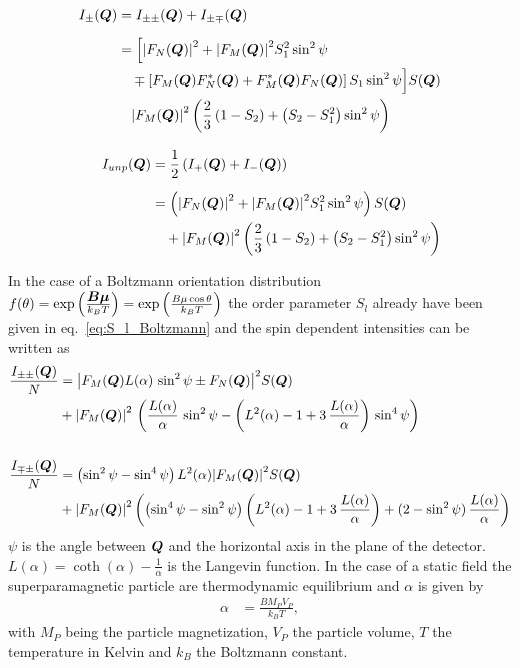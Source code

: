 \begin{subequations} \label{eq:I_iSQ_I_unpSQ}
\begin{align}
\begin{split}
    I_{\pm}(\BM{Q}) &= I_{\pm\pm}(\BM{Q})+I_{\pm\mp}(\BM{Q}) \\[2mm]
                    &= \Bigl[\abs{F_N(\BM{Q})}^2 + \abs{F_M(\BM{Q})}^2S_1^2\sin^2\psi \\
                    & \quad  \mp \left[F_M(\BM{Q})F^*_N(\BM{Q})+F^*_M(\BM{Q})F_N(\BM{Q})\right]S_1\sin^2\psi\Bigr] S(\BM{Q}) \\
                    & \quad \abs{F_M(\BM{Q})}^2\left(\frac{2}{3}\left(1-S_2\right)+\left(S_2-S_1^2\right)\sin^2\psi \right)
\end{split} \\[3mm]
\begin{split}
    I_{unp}(\BM{Q}) &= \frac{1}{2}\left(I_{+}(\BM{Q})+I_{-}(\BM{Q})\right)\\[2mm]
                    &=  \left(\abs{F_N(\BM{Q})}^2 + \abs{F_M(\BM{Q})}^2S_1^2\sin^2\psi\right) S(\BM{Q}) \\
                    & \quad + \abs{F_M(\BM{Q})}^2\left(\frac{2}{3}\left(1-S_2\right)+\left(S_2-S_1^2\right)\sin^2\psi\right)
\end{split}
\end{align}
\end{subequations}

In the case of a Boltzmann orientation distribution
$f(\theta)=\exp\left(\frac{\BM{B\mu}}{k_BT}\right)=\exp\left(\frac{B\mu\cos\theta}{k_BT}\right)$
the order parameter $S_l$ already have been given in eq.\ \ref{eq:S_l_Boltzmann}
and the spin dependent intensities can be written as
\begin{subequations}
\begin{align}
\frac{I_{\pm\pm}(\BM{Q})}{N} &=
\abs{F_M(\BM{Q}) L(\alpha)\,\sin^2\psi
     \pm F_N(\BM{Q})}^2 S(\BM{Q}) \\
&+
\abs{F_M(\BM{Q})}^2\, \left( \frac{L(\alpha)}{\alpha}\,
\sin^2\psi - \left( L^2(\alpha)-1+3\,\frac{L(\alpha)}{\alpha}\right)
\, \sin^4\psi \right) \nonumber \\
\nonumber \\
\frac{I_{\mp\pm}(\BM{Q})}{N} &=
\left( \sin^2\psi - \sin^4\psi \right)
L^2(\alpha)
\abs{F_M(\BM{Q})}^2 S(\BM{Q}) \\
&+
\abs{F_M(\BM{Q})}^2  \left( \left( \sin^4\psi-\sin^2\psi \right)
\left( L^2(\alpha)-1+3\, \frac{L(\alpha)}{\alpha}\right) +
(2-\sin^2\psi)\, \frac{L(\alpha)}{\alpha}\right) \nonumber
\end{align}
\end{subequations}
$\psi$ is the angle between $\BM{Q}$ and the horizontal axis in the plane of the detector.
$L(\alpha)=\coth(\alpha)-\frac{1}{\alpha}$ is the Langevin function. In the case of a static field
the superparamagnetic particle are thermodynamic equilibrium and $\alpha$ is given by
\begin{align}
\alpha&=\frac{BM_PV_P}{k_B T},
\end{align}
with $M_P$ being the particle magnetization, $V_P$ the particle volume,
$T$ the temperature in Kelvin and $k_B$ the Boltzmann constant.

